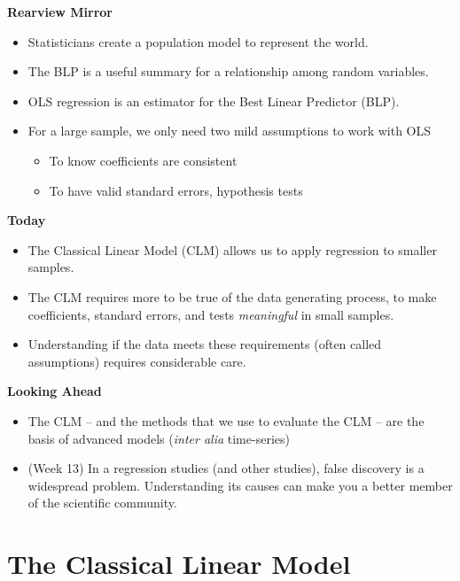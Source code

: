 \documentclass[
  letterpaper,
  DIV=11,
  numbers=noendperiod]{scrreprt}
\providecommand{\tightlist}{%
  \setlength{\itemsep}{0pt}\setlength{\parskip}{0pt}}\usepackage{longtable,booktabs,array}
\begin{document}
\textbf{Rearview Mirror}

\begin{itemize}
\tightlist
\item
  Statisticians create a population model to represent the world.
\item
  The BLP is a useful summary for a relationship among random variables.
\item
  OLS regression is an estimator for the Best Linear Predictor (BLP).
\item
  For a large sample, we only need two mild assumptions to work with OLS

  \begin{itemize}
  \tightlist
  \item
    To know coefficients are consistent
  \item
    To have valid standard errors, hypothesis tests
  \end{itemize}
\end{itemize}

\textbf{Today}

\begin{itemize}
\tightlist
\item
  The Classical Linear Model (CLM) allows us to apply regression to
  smaller samples.
\item
  The CLM requires more to be true of the data generating process, to
  make coefficients, standard errors, and tests \emph{meaningful} in
  small samples.
\item
  Understanding if the data meets these requirements (often called
  assumptions) requires considerable care.
\end{itemize}

\textbf{Looking Ahead}

\begin{itemize}
\tightlist
\item
  The CLM -- and the methods that we use to evaluate the CLM -- are the
  basis of advanced models (\emph{inter alia} time-series)
\item
  (Week 13) In a regression studies (and other studies), false discovery
  is a widespread problem. Understanding its causes can make you a
  better member of the scientific community.
\end{itemize}

\section{The Classical Linear Model}\label{the-classical-linear-model-1}
\end{document}
